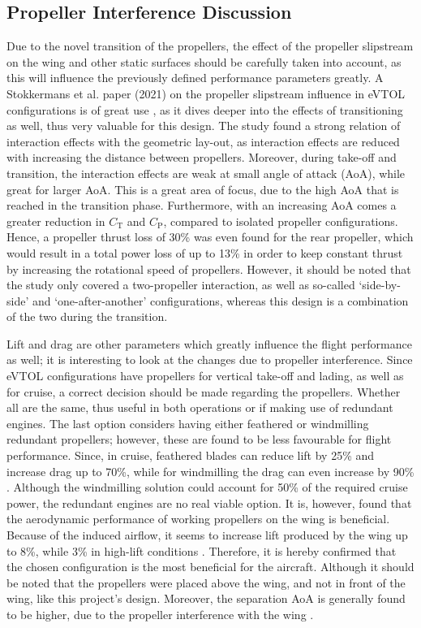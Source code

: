 \subsection{Propeller Interference Discussion}
Due to the novel transition of the propellers, the effect of the propeller slipstream on the wing and other static surfaces should be carefully taken into account, as this will influence the previously defined performance parameters greatly.
A Stokkermans et al.
paper (2021) on the propeller slipstream influence in eVTOL configurations is of great use \cite{stokkermans2021aerodynamic}, as it dives deeper into the effects of transitioning as well, thus very valuable for this design.
The study found a strong relation of interaction effects with the geometric lay-out, as interaction effects are reduced with increasing the distance between propellers.
Moreover, during take-off and transition, the interaction effects are weak at small angle of attack (AoA), while great for larger AoA.
This is a great area of focus, due to the high AoA that is reached in the transition phase.
Furthermore, with an increasing AoA comes a greater reduction in $C_{\text{T}}$ and $C_{\text{P}}$, compared to isolated propeller configurations.
Hence, a propeller thrust loss of 30\% was even found for the rear propeller, which would result in a total power loss of up to 13\% in order to keep constant thrust by increasing the rotational speed of propellers.
However, it should be noted that the study only covered a two-propeller interaction, as well as so-called \enquote*{side-by-side} and \enquote*{one-after-another} configurations, whereas this design is a combination of the two during the transition.

Lift and drag are other parameters which greatly influence the flight performance as well; it is interesting to look at the changes due to propeller interference.
Since eVTOL configurations have propellers for vertical take-off and lading, as well as for cruise, a correct decision should be made regarding the propellers.
Whether all are the same, thus useful in both operations or if making use of redundant engines.
The last option considers having either feathered or windmilling redundant propellers; however, these are found to be less favourable for flight performance.
Since, in cruise, feathered blades can reduce lift by 25\% and increase drag up to 70\%, while for windmilling the drag can even increase by 90\% \cite{zhang2024aerodynamic}.
Although the windmilling solution could account for 50\% of the required cruise power, the redundant engines are no real viable option.
It is, however, found that the aerodynamic performance of working propellers on the wing is beneficial.
Because of the induced airflow, it seems to increase lift produced by the wing up to 8\%, while 3\% in high-lift conditions \cite{marcus2018aerodynamic}.
Therefore, it is hereby confirmed that the chosen configuration is the most beneficial for the aircraft.
Although it should be noted that the propellers were placed above the wing, and not in front of the wing, like this project’s design.
Moreover, the separation AoA is generally found to be higher, due to the propeller interference with the wing \cite{boldman1993effect}.

